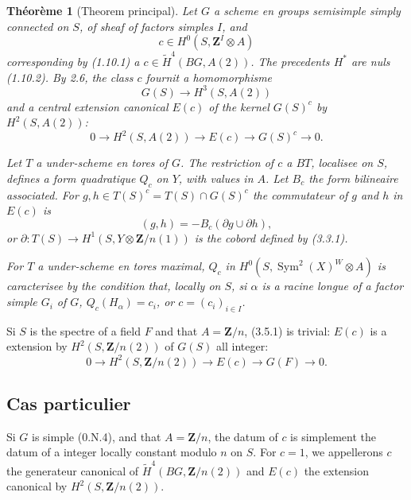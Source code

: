 \documentclass[11pt,a4paper]{article}
\theoremstyle{plain}
\newtheorem{theorem}{Th\'eor\`eme}[section]
\theoremstyle{definition}
\DeclareMathOperator{\Sym}{Sym}
\begin{document}
\begin{theorem}[Theorem principal]\label{3.5}
Let $G$ a scheme en groups semisimple simply connected on $S$, of sheaf of factors simples $I$, and
\[
c \in H^0(S, \mathbf{Z}^I \otimes A)
\]
corresponding by (1.10.1) a $c \in \widetilde{H}^4(BG, A(2))$. The precedents $H^*$ are nuls (1.10.2). By 2.6, the class $c$ fournit a homomorphisme
\begin{equation}\label{3.5.1}
G(S) \to H^3(S, A(2))
\end{equation}
and a central extension canonical $E(c)$ of the kernel $G(S)^c$ by $H^2(S, A(2))$:
\begin{equation}\label{3.5.2}
0 \to H^2(S, A(2)) \to E(c) \to G(S)^c \to 0.
\end{equation}

Let $T$ a under-scheme en tores of $G$. The restriction of $c$ a $BT$, localisee on $S$, defines a form quadratique $Q_c$ on $Y$, with values in $A$. Let $B_c$ the form bilineaire associated. For $g, h \in T(S)^c = T(S) \cap G(S)^c$ the commutateur of $g$ and $h$ in $E(c)$ is
\begin{equation}\label{3.5.3}
(g, h) = -B_c(\partial g \cup \partial h),
\end{equation}
or $\partial : T(S) \to H^1(S, Y \otimes \mathbf{Z}/n(1))$ is the cobord defined by (3.3.1).

For $T$ a under-scheme en tores maximal, $Q_c$ in $H^0(S, \Sym^2(X)^W \otimes A)$ is caracterisee by the condition that, locally on $S$, si $\alpha$ is a racine longue of a factor simple $G_i$ of $G$, $Q_c(H_\alpha) = c_i$, or $c = (c_i)_{i \in I}$.
\end{theorem}

Si $S$ is the spectre of a field $F$ and that $A = \mathbf{Z}/n$, (3.5.1) is trivial: $E(c)$ is a extension by $H^2(S, \mathbf{Z}/n(2))$ of $G(S)$ all integer:
\begin{equation}\label{3.5.4}
0 \to H^2(S, \mathbf{Z}/n(2)) \to E(c) \to G(F) \to 0.
\end{equation}

\subsection{Cas particulier}\label{3.6}

Si $G$ is simple (0.N.4), and that $A = \mathbf{Z}/n$, the datum of $c$ is simplement the datum of a integer locally constant modulo $n$ on $S$. For $c = 1$, we appellerons $c$ the generateur canonical of $\widetilde{H}^4(BG, \mathbf{Z}/n(2))$ and $E(c)$ the extension canonical by $H^2(S, \mathbf{Z}/n(2))$.
\end{document}
